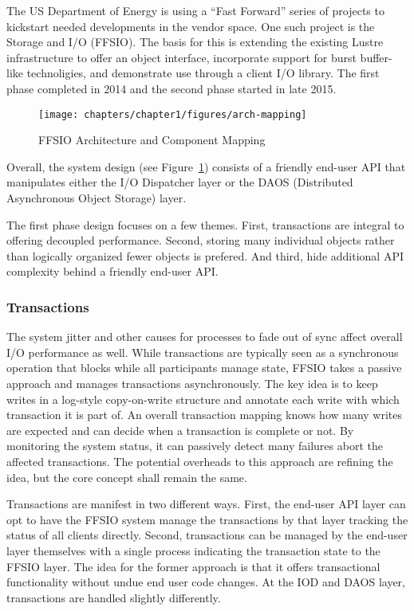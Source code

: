 The US Department of Energy is using a ``Fast Forward'' series of projects to
kickstart needed developments in the vendor space. One such project is the
Storage and I/O (FFSIO). The basis for this is extending the existing Lustre
infrastructure to offer an object interface, incorporate support for burst
buffer-like technoligies, and demonstrate use through a client I/O library. 
The first phase completed in 2014 and the second phase started in late 2015.

\begin{figure}[htbp]
\vspace{-0.10in}
\centering
\texttt{[image: chapters/chapter1/figures/arch-mapping]}
\vspace{-0.15in}
\caption{FFSIO Architecture and Component Mapping}
\label{fig:arch-mapping}
\vspace{-0.15in}
\end{figure}

Overall, the system design (see Figure~\ref{fig:arch-mapping}) consists of a
friendly end-user API that manipulates either the I/O Dispatcher layer or the
DAOS (Distributed Asynchronous Object Storage) layer.

The first phase design focuses on a few themes. First, transactions are
integral to offering decoupled performance. Second, storing many individual
objects rather than logically organized fewer objects is prefered. And third,
hide additional API complexity behind a friendly end-user API.

\subsubsection{Transactions}
The system jitter and other causes for processes to fade out of sync affect
overall I/O performance as well. While transactions are typically seen as a
synchronous operation that blocks while all participants manage state, FFSIO
takes a passive approach and manages transactions asynchronously. The key idea
is to keep writes in a log-style copy-on-write structure and annotate each
write with which transaction it is part of. An overall transaction mapping
knows how many writes are expected and can decide when a transaction is
complete or not. By monitoring the system status, it can passively detect many
failures abort the affected transactions. The potential overheads to this
approach are refining the idea, but the core concept shall remain the same.

Transactions are manifest in two different ways. First, the end-user API layer
can opt to have the FFSIO system manage the transactions by that layer
tracking the status of all clients directly. Second, transactions can be
managed by the end-user layer themselves with a single process indicating the
transaction state to the FFSIO layer. The idea for the former approach is that
it offers transactional functionality without undue end user code changes. At
the IOD and DAOS layer, transactions are handled slightly differently.

